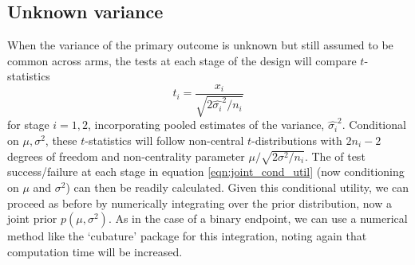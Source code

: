 \documentclass[sagev, Crown]{sagej}
\begin{document}
\subsection{Unknown variance}

When the variance of the primary outcome is unknown but still assumed to be common across arms, the tests at each stage of the design will compare $t$-statistics
$$
t_i = \frac{x_i}{\sqrt{2\hat{\sigma_i}^2 / n_i}}
$$
for stage $i = 1,2$, incorporating pooled estimates of the variance, $\hat{\sigma_i}^2$. Conditional on $\mu, \sigma^2$, these $t$-statistics will follow non-central $t$-distributions with $2n_i - 2$ degrees of freedom and non-centrality parameter $\mu/\sqrt{2\sigma^2 / n_i}$. The of test success/failure at each stage in equation \ref{eqn:joint_cond_util} (now conditioning on $\mu$ and $\sigma^2$) can then be readily calculated. Given this conditional utility, we can proceed as before by numerically integrating over the prior distribution, now a joint prior $p(\mu, \sigma^2)$. As in the case of a binary endpoint, we can use a numerical method like the `cubature' package for this integration, noting again that computation time will be increased.


\end{document}
